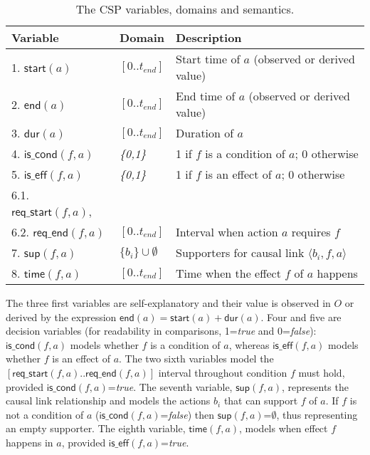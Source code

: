 \documentclass{ecai}
\newcommand{\tup}[1]{{\langle #1 \rangle}}
\newcommand{\dur}{\mathsf{dur}}    %
\newcommand{\iscond}{\mathsf{is\_cond}}    %
\newcommand{\iseff}{\mathsf{is\_eff}}    %
\newcommand{\start}{\mathsf{start}}%
\newcommand{\en}{\mathsf{end}}     %
\newcommand{\supp}{\mathsf{sup}}   %
\newcommand{\tim}{\mathsf{time}}   %
\newcommand{\reqs}{\mathsf{req\_{start}}} %
\newcommand{\reqe}{\mathsf{req\_{end}}}   %
\begin{document}
\begin{table}
\begin{center}
\caption{The CSP variables, domains and semantics.}
\begin{scriptsize}
\begin{tabular}{llp{4.4cm}}
\hline	
{\bf Variable} & {\bf Domain} & {\bf Description} \\
\hline
1. $\start(a)$ & $[0..t_{end}]$ & Start time of $a$ (observed or derived value) \\
2. $\en(a)$ & $[0..t_{end}]$ & End time of $a$ (observed or derived value) \\
3. $\dur(a)$ & $[0..t_{end}]$ & Duration of $a$ \\

4. $\iscond(f,a)$ & \textit{\{0,1\}} & 1 if $f$ is a condition of $a$; 0 otherwise \\
5. $\iseff(f,a)$ & \textit{\{0,1\}} & 1 if $f$ is an effect of $a$; 0 otherwise \\

6.1. $\reqs(f,a)$, &  \\ 
6.2. $\reqe(f,a)$  & $[0..t_{end}]$ & Interval when action $a$ requires $f$\\

7. $\supp(f,a)$ & $\{b_i\} \cup \emptyset $&  Supporters for causal link $\tup{b_i,f,a}$ \\ %
8. $\tim(f,a)$ & $[0..t_{end}]$ & Time when the effect $f$ of $a$ happens\\

\end{tabular}
\end{scriptsize}
\label{table:variables}
\end{center}
\end{table}

The three first variables are self-explanatory and their value is observed in $O$ or derived by the expression $\en(a)=\start(a)+\dur(a)$.
Four and five are decision variables (for readability in comparisons, 1=\textit{true} and 0=\textit{false}): $\iscond(f,a)$ models whether $f$ is a condition of $a$, whereas $\iseff(f,a)$ models whether $f$ is an effect of $a$. The two sixth variables model the $[\reqs(f,a)..\reqe(f,a)]$ interval throughout condition $f$ must hold, provided $\iscond(f,a)$=\textit{true}.
The seventh variable, $\supp(f,a)$, represents the causal link relationship and models the actions $b_i$ that can support $f$ of $a$. If $f$ is not a condition of $a$ ($\iscond(f,a)$=\textit{false}) then $\supp(f,a)$=$\emptyset$, thus representing an empty supporter.
The eighth variable, $\tim(f,a)$, models when effect $f$ happens in $a$, provided $\iseff(f,a)$=\textit{true}.
\end{document}
